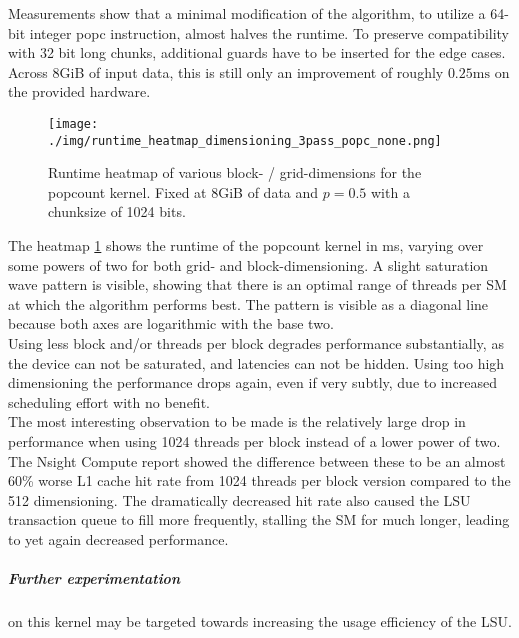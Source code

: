 \documentclass{tudscrreprt}
\begin{document}
			Measurements show that a minimal modification of the algorithm, to utilize a 64-bit integer popc instruction, almost halves the runtime. To preserve compatibility with 32 bit long chunks, additional guards have to be inserted for the edge cases. Across 8GiB of input data, this is still only an improvement of roughly $0.25\text{ms}$ on the provided hardware. \\
			
			\begin{figure}[!ht]
				\centering
				\texttt{[image: ./img/runtime\_heatmap\_dimensioning\_3pass\_popc\_none.png]}
				\caption{\label{fig:runtime_heatmap_dimensioning_3pass_popc_none}Runtime heatmap of various block- / grid-dimensions for the popcount kernel. Fixed at 8GiB of data and $p=0.5$ with a chunksize of 1024 bits.}
			\end{figure}
			
			The heatmap \ref{fig:runtime_heatmap_dimensioning_3pass_popc_none} shows the runtime of the popcount kernel in ms, varying over some powers of two for both grid- and block-dimensioning. A slight saturation wave pattern is visible, showing that there is an optimal range of threads per SM at which the algorithm performs best. The pattern is visible as a diagonal line because both axes are logarithmic with the base two. \\
			Using less block and/or threads per block degrades performance substantially, as the device can not be saturated, and latencies can not be hidden. Using too high dimensioning the performance drops again, even if very subtly, due to increased scheduling effort with no benefit. \\
			The most interesting observation to be made is the relatively large drop in performance when using 1024 threads per block instead of a lower power of two. The Nsight Compute report showed the difference between these to be an almost 60\% worse L1 cache hit rate from 1024 threads per block version compared to the 512 dimensioning. The dramatically decreased hit rate also caused the LSU transaction queue to fill more frequently, stalling the SM for much longer, leading to yet again decreased performance. \\
			
			\subparagraph{Further experimentation} on this kernel may be targeted towards increasing the usage efficiency of the LSU. \\
			
\end{document}

